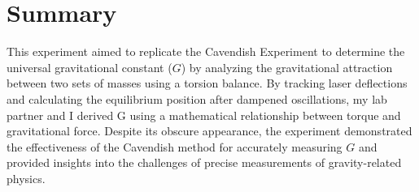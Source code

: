 \documentclass[a4paper,12pt,english]{all-in-one} %
\begin{document}

\section*{Summary}
{
This experiment aimed to replicate the Cavendish Experiment to determine the universal gravitational constant ($G$) by analyzing the gravitational attraction between two sets of masses using a torsion balance. By tracking laser deflections and calculating the equilibrium position after dampened oscillations, my lab partner and I derived G using a mathematical relationship between torque and gravitational force. Despite its obscure appearance, the experiment demonstrated the effectiveness of the Cavendish method for accurately measuring 
$G$ and provided insights into the challenges of precise measurements of gravity-related physics.
}
\end{document}
